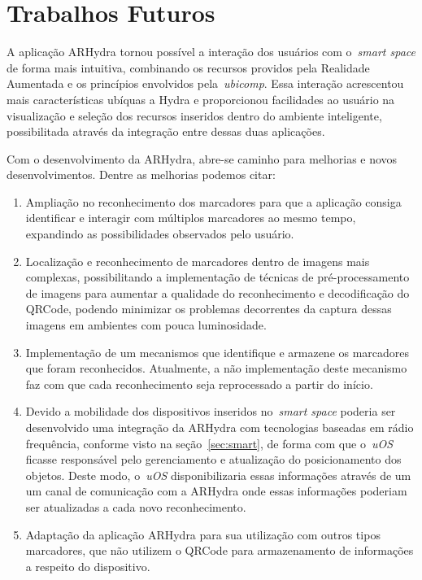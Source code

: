  \section{Trabalhos Futuros}

	A aplicação ARHydra tornou possível a interação dos usuários com o~\textit{smart space} de forma 
	mais intuitiva, combinando os recursos providos pela Realidade Aumentada e os princípios envolvidos
	pela~\textit{ubicomp}. Essa interação acrescentou mais características ubíquas a Hydra e proporcionou facilidades 
	ao usuário na visualização e seleção dos recursos inseridos dentro do ambiente inteligente, possibilitada 
	através da integração entre dessas duas aplicações. 
	
	Com o desenvolvimento da ARHydra, abre-se caminho para melhorias e novos desenvolvimentos. Dentre as melhorias 
	podemos citar: 
	
	\begin{enumerate}
	  
	  \item Ampliação no reconhecimento dos marcadores para que a aplicação consiga identificar e interagir com 
	  		múltiplos marcadores ao mesmo tempo, expandindo as possibilidades observados pelo usuário.
	  
	  \item Localização e reconhecimento de marcadores dentro de imagens mais complexas, possibilitando a implementação 
	  		de técnicas de pré-processamento de imagens para aumentar a qualidade do reconhecimento e decodificação do 
	  		QRCode, podendo minimizar os problemas decorrentes da captura dessas imagens em ambientes com pouca luminosidade. 
	   
	  \item Implementação de um mecanismos que identifique e armazene os marcadores que	foram reconhecidos. Atualmente, 
	  		a não implementação deste mecanismo faz com que cada reconhecimento seja reprocessado a partir do início.
			
	  \item Devido a mobilidade dos dispositivos inseridos no~\textit{smart space} poderia 
			ser desenvolvido uma integração	da ARHydra com tecnologias baseadas em rádio frequência, conforme visto 
			na seção~\ref{sec:smart}, de forma com que o~\textit{uOS} ficasse responsável pelo gerenciamento e 
			atualização do posicionamento dos objetos. Deste modo, o~\textit{uOS} disponibilizaria essas informações
			através de um um canal de comunicação com a ARHydra onde essas informações poderiam ser atualizadas a cada
			novo reconhecimento.     
			
	  \item Adaptação da aplicação ARHydra para sua utilização com outros tipos marcadores, que não utilizem o 
	  		QRCode para armazenamento de informações a respeito do dispositivo.
	  		
	\end{enumerate}
